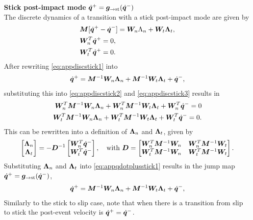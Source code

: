 \documentclass[../DC2017114Bouma.tex]{subfiles}
\begin{document}
\textbf{Stick post-impact mode} $\dot{\qb}^+ = \gb_{\rightarrow\text{st}}(\dot{\qb}^-)$\\
The discrete dynamics of a transition with a stick post-impact mode are given by
\begin{align}
&\Mb[\dot{\qb}^+ - \dot{\qb}^-] = \Wb_{n}\Lambda_{n} + \Wb_{t}\Lambdab_{t},\label{eq:appdiscstick1}\\
&\Wb^T_{n}\dot{\qb}^+ = 0,\label{eq:appdiscstick2}\\
&\Wb^T_{t}\dot{\qb}^+ = 0.\label{eq:appdiscstick3}
\end{align}
After rewriting \eqref{eq:appdiscstick1} into
\begin{align}
\dot{\qb}^+ = \Mb^{-1}\Wb_{n}\Lambdab_{n} + \Mb^{-1}\Wb_{t}\Lambdab_{t} + \dot{\qb}^-,\label{eq:appqdotplusstick1}
\end{align}
substituting this into \eqref{eq:appdiscstick2} and \eqref{eq:appdiscstick3} results in
\begin{align}
\Wb_{n}^T\Mb^{-1}\Wb_{n}\Lambdab_{n} + \Wb_{n}^T\Mb^{-1}\Wb_{t}\Lambdab_{t} + \Wb^T_{n}\dot{\qb}^- = 0\\
\Wb_{t}^T\Mb^{-1}\Wb_{n}\Lambdab_{n} + \Wb_{t}^T\Mb^{-1}\Wb_{t}\Lambdab_{t} + \Wb^T_{t}\dot{\qb}^- = 0.
\end{align}
This can be rewritten into a definition of $\Lambdab_{n}$ and $\Lambdab_{t}$, given by
\begin{align}
\begin{bmatrix}
\Lambdab_{n}\\
\Lambdab_{t}
\end{bmatrix} = -\Db^{-1}\begin{bmatrix}
\Wb^T_{n}\dot{\qb}^-\\
\Wb^T_{t}\dot{\qb}^-
\end{bmatrix},\quad \text{with } \Db = \begin{bmatrix}
\Wb_{n}^T\Mb^{-1}\Wb_{n} & \Wb_{n}^T\Mb^{-1}\Wb_{t}\\
\Wb_{t}^T\Mb^{-1}\Wb_{n} & \Wb_{t}^T\Mb^{-1}\Wb_{t}
\end{bmatrix}.
\end{align}
Substituting $\Lambdab_{n}$ and $\Lambdab_{t}$ into \eqref{eq:appqdotplusstick1} results in the jump map $\dot{\qb}^+ = \gb_{\rightarrow\text{st}}(\dot{\qb}^-)$,
\begin{align}
\dot{\qb}^+ = \Mb^{-1}\Wb_{n}\Lambdab_{n} + \Mb^{-1}\Wb_{t}\Lambdab_{t} + \dot{\qb}^-,\label{eq:appgstick}
\end{align}
Similarly to the stick to slip case, note that when there is a transition from slip to stick the post-event velocity is $\dot{\qb}^+ = \dot{\qb}^-$.
\end{document}
